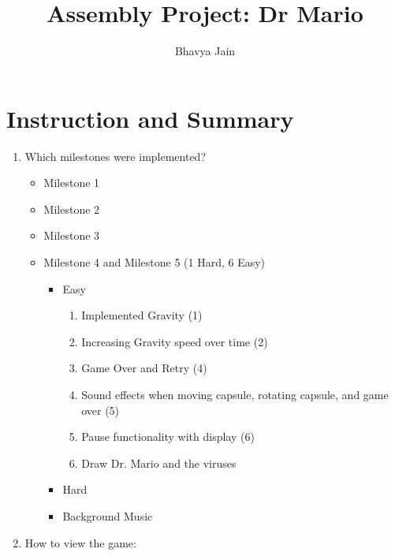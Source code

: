 \documentclass{article}
\title{Assembly Project: Dr Mario}
\author{Bhavya Jain}
\begin{document}
\maketitle

\section{Instruction and Summary}

\begin{enumerate}

    \item Which milestones were implemented? 
        \begin{itemize}
            \item Milestone 1
            \item Milestone 2
            \item Milestone 3
            \item Milestone 4 and Milestone 5 (1 Hard, 6 Easy)
            \begin{itemize}
                \item Easy
                \begin{enumerate}
                    \item Implemented Gravity (1)
                    \item Increasing Gravity speed over time (2)
                    \item Game Over and Retry (4)
                    \item Sound effects when moving capsule, rotating capsule, and      
                     game over (5)
                     \item Pause functionality with display (6)
                     \item Draw Dr. Mario and the viruses

                \end{enumerate}
                \item Hard
                \end{itemize}
                \begin{itemize}
                    \item Background Music
                \end{itemize}
        \end{itemize}

    \item How to view the game:
    
    \begin{enumerate}


\end{enumerate}
\end{enumerate}
\end{document}
